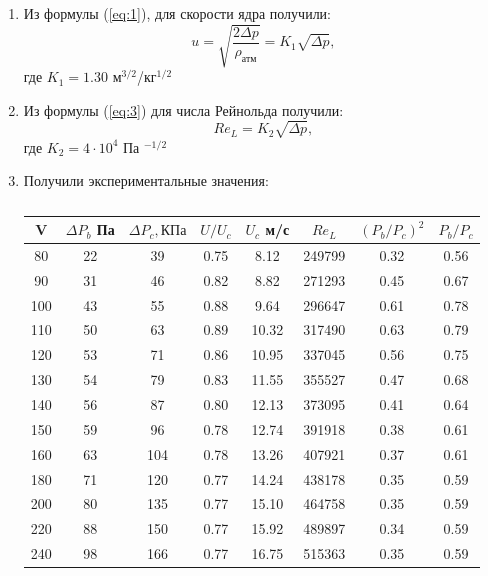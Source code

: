 \documentclass[12pt,a4paper]{article}
\begin{document}
    \begin{enumerate}
        
    
    \item \par Из формулы (\ref{eq:1}), для скорости ядра получили:
    \begin{equation*}
        u = \sqrt{\frac{2\Delta p}{\rho_{атм}}} = K_1 \sqrt{\Delta p},
    \end{equation*}
    где $K_1 = 1.30$ м$^{3/2}$/кг$^{1/2}$
    \item \par Из формулы (\ref{eq:3}) для числа Рейнольда получили:
    \begin{equation*}
        Re_L = K_2 \sqrt{\Delta p},
    \end{equation*}
    где $K_2 = 4 \cdot 10^4 $ Па $^{-1/2}$

    \item Получили экспериментальные значения:
    \begin{table}[h!]
        \centering
        \begin{tabular}{|c|c|c|c|c|c|c|c|}
        \hline
    V &   $\Delta P_{b}$ Па&    $\Delta P_{c}, КПа$ &  $U/U_c $& $U_c$ м/с& $Re_L$ & $\left(P_{b}/P_{c}\right)^{2}$ &  $P_{b}/P_{c}$ \\
    \hline
      80 &  22 &   39 &  0.75 &   8.12 &  249799 &  0.32 &  0.56 \\ \hline
      90 &  31 &   46 &  0.82 &   8.82 &  271293 &  0.45 &  0.67 \\ \hline
      100 &  43 &   55 &  0.88 &   9.64 &  296647 &  0.61 &  0.78 \\ \hline
      110 &  50 &   63 &  0.89 &  10.32 &  317490 &  0.63 &  0.79 \\ \hline
      120 &  53 &   71 &  0.86 &  10.95 &  337045 &  0.56 &  0.75 \\ \hline
      130 &  54 &   79 &  0.83 &  11.55 &  355527 &  0.47 &  0.68 \\ \hline
      140 &  56 &   87 &  0.80 &  12.13 &  373095 &  0.41 &  0.64 \\ \hline
      150 &  59 &   96 &  0.78 &  12.74 &  391918 &  0.38 &  0.61 \\ \hline
      160 &  63 &  104 &  0.78 &  13.26 &  407921 &  0.37 &  0.61 \\ \hline
      180 &  71 &  120 &  0.77 &  14.24 &  438178 &  0.35 &  0.59 \\ \hline
      200 &  80 &  135 &  0.77 &  15.10 &  464758 &  0.35 &  0.59 \\ \hline
      220 &  88 &  150 &  0.77 &  15.92 &  489897 &  0.34 &  0.59 \\ \hline
      240 &  98 &  166 &  0.77 &  16.75 &  515363 &  0.35 &  0.59 \\ \hline
        \end{tabular}
        \caption{}
        \label{tab:1}
    \end{table}
    

\end{enumerate}
\end{document}
